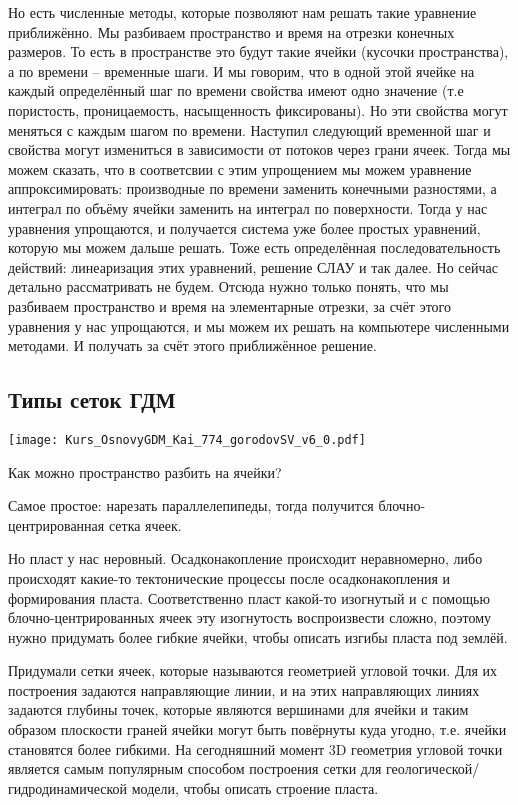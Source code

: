 \documentclass[main.tex]{subfiles}
\begin{document}
Но есть численные методы, которые позволяют нам решать такие уравнение приближённо.
Мы разбиваем пространство и время на отрезки конечных размеров. То есть в пространстве это будут такие ячейки (кусочки пространства), а по времени -- временные шаги. И мы говорим, что в одной этой ячейке на каждый определённый шаг по времени свойства имеют одно значение (т.е пористость, проницаемость, насыщенность фиксированы).
Но эти свойства могут меняться с каждым шагом по времени.
Наступил следующий временной шаг и свойства могут измениться в зависимости от потоков через грани ячеек.
Тогда мы можем сказать, что в соответсвии с этим упрощением мы можем уравнение аппроксимировать: производные по времени заменить конечными разностями, а интеграл по объёму ячейки заменить на интеграл по поверхности. Тогда у нас уравнения упрощаются, и получается система уже более простых уравнений, которую мы можем дальше решать.
Тоже есть определённая последовательность действий: линеаризация этих уравнений, решение СЛАУ и так далее.
Но сейчас детально рассматривать не будем.
Отсюда нужно только понять, что мы разбиваем пространство и время на элементарные отрезки, за счёт этого уравнения у нас упрощаются, и мы можем их решать на компьютере численными методами.
И получать за счёт этого приближённое решение.

\subsection{Типы сеток ГДМ}

\texttt{[image: Kurs\_OsnovyGDM\_Kai\_774\_gorodovSV\_v6\_0.pdf]}

Как можно пространство разбить на ячейки?

Самое простое: нарезать параллелепипеды, тогда получится блочно-центрированная сетка ячеек.

Но пласт у нас неровный. Осадконакопление происходит неравномерно, либо происходят какие-то тектонические процессы после осадконакопления и формирования пласта.
Соответственно пласт какой-то изогнутый и с помощью блочно-центрированных ячеек эту изогнутость воспроизвести сложно, поэтому нужно придумать более гибкие ячейки, чтобы описать изгибы пласта под землёй.

Придумали сетки ячеек, которые называются геометрией угловой точки.
Для их построения задаются направляющие линии, и на этих направляющих линиях задаются глубины точек, которые являются вершинами для ячейки и таким образом плоскости граней ячейки могут быть повёрнуты куда угодно, т.е. ячейки становятся более гибкими.
На сегодняшний момент 3D геометрия угловой точки является самым популярным способом построения сетки для геологической/гидродинамической модели, чтобы описать строение пласта.
\end{document}
